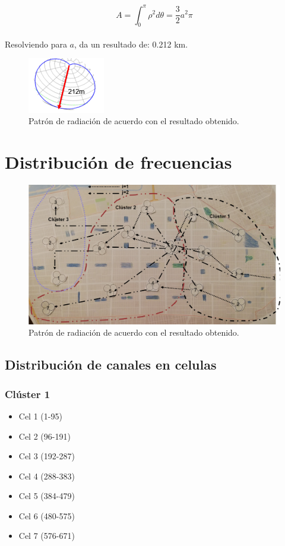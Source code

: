 \documentclass[11pt,letterpaper]{article}
\begin{document}
\begin{equation}
    A=\int_{0}^{\pi} \rho^2 d\theta = \frac{3}{2} a^2 \pi
\end{equation}
\\
Resolviendo para $a$, da un resultado de: 0.212 km.
\begin{figure}[ht]
    \centering
    \includegraphics[width=0.3\textwidth]{imagenes/t10.png}
    \caption{Patrón de radiación de acuerdo con el resultado obtenido.}
\end{figure}

\newpage
\section{Distribución de frecuencias}
\begin{figure}[ht]
    \centering
    \includegraphics[width=.9\textwidth, angle=90]{imagenes/t11.png}
    \caption{Patrón de radiación de acuerdo con el resultado obtenido.}
\end{figure}

\newpage
\subsection{Distribución de canales en celulas}
\subsubsection{Clúster 1}
\begin{itemize}
    \item Cel 1 (1-95)
    \item Cel 2 (96-191)
    \item Cel 3 (192-287)
    \item Cel 4 (288-383)
    \item Cel 5 (384-479)
    \item Cel 6 (480-575)
    \item Cel 7 (576-671)
\end{itemize}
\end{document}
